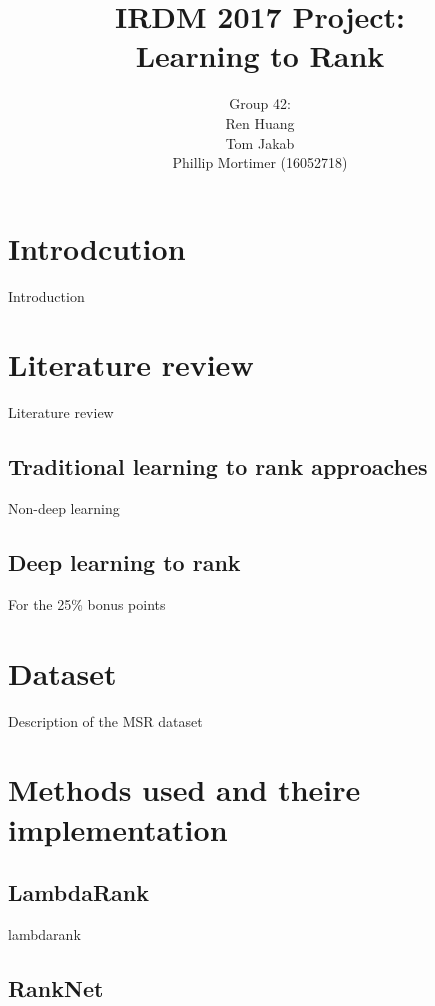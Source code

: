 \documentclass[english]{article}
\theoremstyle{definition}
\begin{document}
\title{IRDM 2017 Project:\\Learning to Rank
}
\author{Group 42:\\
Ren Huang \\
Tom Jakab\\
Phillip Mortimer (16052718)}
\maketitle

\section{Introdcution}

Introduction

\section{Literature review}

Literature review

\subsection{Traditional learning to rank approaches}

Non-deep learning

\subsection{Deep learning to rank}

For the 25\% bonus points

\section{Dataset}

Description of the MSR dataset

\section{Methods used and theire implementation}

\subsection{LambdaRank}

lambdarank

\subsection{RankNet}
\end{document}
